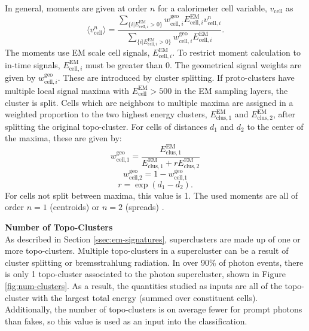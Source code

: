 In general, moments are given at order $n$ for a calorimeter cell variable, $v_{\text{cell}}$ as
\begin{equation}\label{eqn:moment-calculation}
    \langle v_{\text{cell}}^{n} \rangle = \frac{
        \sum_{\{i|E_{\text{cell},i}^{\text{EM}}>0\}}w^{\text{geo}}_{\text{cell},i} E_{\text{cell},i}^{\text{EM}} v_{\text{cell},i}^{n}
    }
    {
        \sum_{\{i|E_{\text{cell},i}^{\text{EM}}>0\}}w^{\text{geo}}_{\text{cell},i} E_{\text{cell},i}^{\text{EM}}
    }.
\end{equation}
The moments use \gls{EM} scale cell signals, $E_{\text{cell},i}^{\text{EM}}$. To restrict moment calculation to in-time signals, $E_{\text{cell},i}^{\text{EM}}$ must be greater than 0. The geometrical signal weights are given by $w^{\text{geo}}_{\text{cell},i}$. These are introduced by cluster splitting. If proto-clusters have multiple local signal maxima with $E_{\text{cell}}^{\text{EM}} > 500$ in the \gls{EM} sampling layers, the cluster is split. Cells which are neighbors to multiple maxima are assigned in a weighted proportion to the two highest energy clusters, $E_{\text{clus},1}^{\text{EM}}$ and $E_{\text{clus},2}^{\text{EM}}$, after splitting the original topo-cluster. For cells of distances $d_1$ and $d_2$ to the center of the maxima, these are given by: 
\begin{equation}
    w^{\text{geo}}_{\text{cell,1}} = \frac{E_{\text{clus},1}^{\text{EM}}}{E_{\text{clus},1}^{\text{EM}} + r E_{\text{clus},2}^{\text{EM}}}
\end{equation}
\begin{equation}
    w^{\text{geo}}_{\text{cell,2}} = 1-w^{\text{geo}}_{\text{cell,1}}
\end{equation}
\begin{equation}
    r = \exp(d_1 -d_2).
\end{equation}
For cells not split between maxima, this value is 1. The used moments are all of order $n=1$ (centroids) or $n=2$ (spreads) \cite{topo-cluster}.

\noindent\textbf{Number of Topo-Clusters}\\
\indent As described in Section \ref{ssec:em-signatures}, superclusters are made up of one or more topo-clusters. Multiple topo-clusters in a supercluster can be a result of cluster splitting or bremsstrahlung radiation. In over 90\% of photon events, there is only 1 topo-cluster associated to the photon supercluster, shown in Figure \ref{fig:num-clusters}. As a result, the quantities studied as inputs are all of the topo-cluster with the largest total energy (summed over constituent cells). Additionally, the number of topo-clusters is on average fewer for prompt photons than fakes, so this value is used as an input into the classification.


